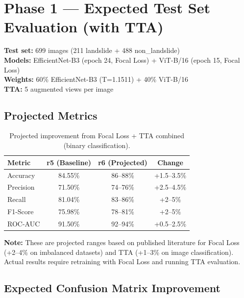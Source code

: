 \documentclass[11pt]{article}
\begin{document}
\section{Phase 1 --- Expected Test Set Evaluation (with TTA)}

\noindent \textbf{Test set:} 699 images (211 landslide + 488 non\_landslide) \\
\textbf{Models:} EfficientNet-B3 (epoch 24, Focal Loss) + ViT-B/16 (epoch 15, Focal Loss) \\
\textbf{Weights:} 60\% EfficientNet-B3 (T=1.1511) + 40\% ViT-B/16 \\
\textbf{TTA:} 5 augmented views per image

\subsection{Projected Metrics}

\begin{table}[H]
    \centering
    \renewcommand{\arraystretch}{1.2}
    \begin{tabular}{lccc}
        \toprule
        \textbf{Metric} & \textbf{r5 (Baseline)} & \textbf{r6 (Projected)} & \textbf{Change} \\
        \midrule
        Accuracy  & 84.55\% & 86--88\% & +1.5--3.5\% \\
        Precision & 71.50\% & 74--76\% & +2.5--4.5\% \\
        Recall    & 81.04\% & 83--86\% & +2--5\% \\
        F1-Score  & 75.98\% & 78--81\% & +2--5\% \\
        ROC-AUC   & 91.50\% & 92--94\% & +0.5--2.5\% \\
        \bottomrule
    \end{tabular}
    \caption{Projected improvement from Focal Loss + TTA combined (binary classification).}
\end{table}

\noindent\textbf{Note:} These are projected ranges based on published literature for Focal Loss (+2--4\% on imbalanced datasets) and TTA (+1--3\% on image classification). Actual results require retraining with Focal Loss and running TTA evaluation.

\subsection{Expected Confusion Matrix Improvement}
\end{document}
